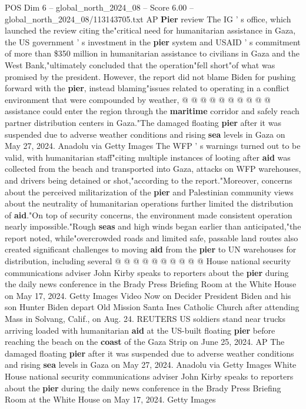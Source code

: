 \begin{textsample}{POS Dim 6 – global\_north\_2024\_08 – Score 6.00 – global\_north\_2024\_08/113143705.txt}
AP \textbf{Pier} review The IG ' s office, which launched the review citing the"critical need for humanitarian assistance in Gaza, the US government ' s investment in the \textbf{pier} system and USAID ' s commitment of more than \$350 million in humanitarian assistance to civilians in Gaza and the West Bank,"ultimately concluded that the operation"fell short"of what was promised by the president.
However, the report did not blame Biden for pushing forward with the \textbf{pier}, instead blaming"issues related to operating in a conflict environment that were compounded by weather, @ @ @ @ @ @ @ @ @ @ assistance could enter the region through the \textbf{maritime} corridor and safely reach partner distribution centers in Gaza."The damaged floating \textbf{pier} after it was suspended due to adverse weather conditions and rising \textbf{sea} levels in Gaza on May 27, 2024.
Anadolu via Getty Images The WFP ' s warnings turned out to be valid, with humanitarian staff"citing multiple instances of looting after \textbf{aid} was collected from the beach and transported into Gaza, attacks on WFP warehouses, and drivers being detained or shot,"according to the report."Moreover, concerns about the perceived militarization of the \textbf{pier} and Palestinian community views about the neutrality of humanitarian operations further limited the distribution of \textbf{aid}."On top of security concerns, the environment made consistent operation nearly impossible."Rough \textbf{seas} and high winds began earlier than anticipated,"the report noted, while"overcrowded roads and limited safe, passable land routes also created significant challenges to moving \textbf{aid} from the \textbf{pier} to UN warehouses for distribution, including several @ @ @ @ @ @ @ @ @ @ House national security communications adviser John Kirby speaks to reporters about the \textbf{pier} during the daily news conference in the Brady Press Briefing Room at the White House on May 17, 2024.
Getty Images Video Now on Decider President Biden and his son Hunter Biden depart Old Mission Santa Ines Catholic Church after attending Mass in Solvang, Calif., on Aug. 24.
REUTERS US soldiers stand near trucks arriving loaded with humanitarian \textbf{aid} at the US-built floating \textbf{pier} before reaching the beach on the \textbf{coast} of the Gaza Strip on June 25, 2024.
AP The damaged floating \textbf{pier} after it was suspended due to adverse weather conditions and rising \textbf{sea} levels in Gaza on May 27, 2024.
Anadolu via Getty Images White House national security communications adviser John Kirby speaks to reporters about the \textbf{pier} during the daily news conference in the Brady Press Briefing Room at the White House on May 17, 2024.
Getty Images

\end{textsample}
